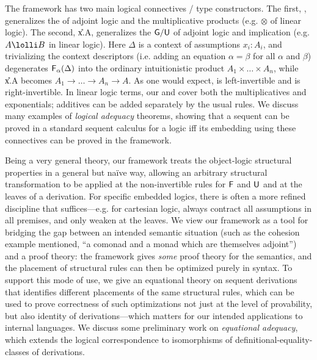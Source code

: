 The framework has two main logical connectives / type constructors.  The
first, \F{\alpha}{\Delta}, generalizes the  of adjoint logic and
the multiplicative products (e.g. $\otimes$ of linear logic).  The
second, \U{x.\alpha}{\Delta}{A}, generalizes the $\mathsf{G}/\mathsf{U}$ of
adjoint logic and implication (e.g. $A \lolli B$ in linear logic).  Here
$\Delta$ is a context of assumptions $x_i:A_i$, and trivializing the
context descriptors (i.e. adding an equation $\alpha = \beta$ for all
$\alpha$ and $\beta$) degenerates $\mathsf{F}_{\alpha}(\Delta)$ into the ordinary
intuitionistic product $A_1 \times \ldots \times A_n$, while
\U{x.\alpha}{\Delta}{A} becomes $A_1 \to \ldots \to A_n \to A$.  
As one would expect,  is left-invertible and  is right-invertible.
In linear logic terms, our  and  cover both the
multiplicatives and exponentials; additives can be added separately by
the usual rules.  We discuss many examples of \emph{logical adequacy}
theorems, showing that a sequent can be proved in a standard sequent
calculus for a logic iff its embedding using these connectives can be
proved in the framework.


Being a very general theory, our framework treats the object-logic
structural properties in a general but na\"ive way, allowing an
arbitrary structural transformation to be applied at the non-invertible
rules for $\mathsf{F}$ and $\mathsf{U}$ and at the leaves of a derivation.
For specific embedded logics, there is often a more refined discipline
that suffices---e.g. for cartesian logic, always contract all
assumptions in all premises, and only weaken at the leaves.  We view our
framework as a tool for bridging the gap between an intended semantic
situation (such as the cohesion example mentioned, ``a comonad and a
monad which are themselves adjoint'') and a proof theory: the framework
gives \emph{some} proof theory for the semantics, and the placement of
structural rules can then be optimized purely in syntax.  To support
this mode of use, we give an equational theory on sequent derivations
that identifies different placements of the same structural rules, which
can be used to prove correctness of such optimizations not just at the
level of provability, but also identity of derivations---which matters
for our intended applications to internal languages.  We discuss some
preliminary work on \emph{equational adequacy}, which extends the
logical correspondence to isomorphisms of definitional-equality-classes
of derivations.

